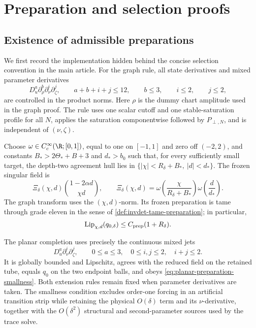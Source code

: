 \section{Preparation and selection proofs}
\label{sec:supplementary-selection-proofs}

\subsection{Existence of admissible preparations}
\label{subsec:supplementary-preparation-existence}

We first record the implementation hidden behind the concise selection
convention in the main article.  For the graph rule, all state derivatives
and mixed parameter derivatives
\begin{equation}
 D_u^a\partial_\rho^b\partial_\nu^i\partial_\zeta^j,
 \qquad a+b+i+j\le12,\qquad b\le3,\qquad i\le2,\qquad j\le2,
                                                               \label{eq:preparation-derivative-list}
\end{equation}
are controlled in the product norms.  Here \(\rho\) is the dummy chart
amplitude used in the graph proof.  The rule uses one scalar cutoff and one
stable-saturation profile for all \(N\), applies the saturation
componentwise followed by \(P_{\perp,N}\), and is independent of
\((\nu,\zeta)\).

Choose \(\omega\in C_c^\infty(\R;[0,1])\), equal to one on \([-1,1]\) and
zero off \((-2,2)\), and constants
\(B_*>2\Theta_*+B+3\) and \(d_*>b_0\) such that, for every sufficiently
small target, the depth-two agreement hull lies in
\(\{|\chi|<R_\delta+B_*,\ |d|<d_*\}\).  The frozen singular field is
\begin{equation}
 \Xi_\delta(\chi,d)
 \binom{1-2\alpha d}{\chi d},\qquad
 \Xi_\delta(\chi,d)=
 \omega\!\left(\frac{\chi}{R_\delta+B_*}\right)
 \omega\!\left(\frac d{d_*}\right).                 \label{eq:fixed-singular-preparation}
\end{equation}
The graph transform uses the \((\chi,d)\)-norm.  Its frozen preparation is
tame through grade eleven in the sense of
\cref{def:invdet-tame-preparation}; in particular,
\begin{equation}
 \operatorname{Lip}_{\chi,d}(q_{0,\delta})
 \le C_{\rm prep}(1+R_\delta).                       \label{eq:fixed-singular-lipschitz}
\end{equation}

The planar completion uses precisely the continuous mixed jets
\begin{equation}
 D_u^a\partial_\nu^i\partial_\zeta^j,
 \qquad 0\le a\le3,\quad 0\le i,j\le2,\quad i+j\le2. \label{eq:planar-required-jets}
\end{equation}
It is globally bounded and Lipschitz, agrees with the reduced field on the
retained tube, equals \(q_0\) on the two endpoint balls, and obeys
\cref{eq:planar-preparation-smallness}.  Both extension rules remain fixed
when parameter derivatives are taken.  The smallness condition excludes
order-one forcing in an artificial transition strip while retaining the
physical \(O(\delta)\) term and its \(\nu\)-derivative, together with the
\(O(\delta^2)\) structural and second-parameter sources used by the trace
solve.

